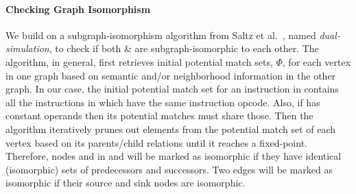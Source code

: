 \paragraph{Checking Graph Isomorphism}
%
We build on a subgraph-isomorphism algorithm from Saltz 
et al.~\cite{Saltz2014}, named 
\emph{dual-simulation},  to check if both \GN \& \GNP are 
subgraph-isomorphic to each other. The algorithm, in general, first 
retrieves initial potential match sets, $\Phi$,  for each vertex in one 
graph based on semantic and/or neighborhood information in the other graph.
In our case, the initial potential match set for an instruction 
\IN in \GN contains all the instructions in \GNP which have the same 
instruction opcode. Also, if \IN has constant operands then its potential 
matches must share 
those.  
Then the algorithm iteratively prunes out elements from the 
potential match 
set of each vertex based on its parents/child relations until it reaches a 
fixed-point.
%
Therefore, nodes  and \Ap in \GN and \GNP will be marked as isomorphic if
they have identical (isomorphic) sets of predecessors and successors.
%
Two edges will be marked as isomorphic if their source and sink nodes are isomorphic.



